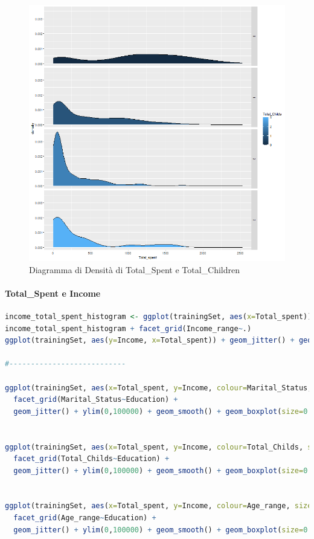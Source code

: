 \documentclass[letterpaper,11pt]{article}
\begin{document}
\begin{figure}[h]
\begin{minipage}[b]{0.4\textwidth}
    \includegraphics[width=\textwidth]{Img/EDA/EDA033.png}
    \caption{Diagramma di Densità di Total\_Spent e Total\_Children}
    \label{fig:DensitaTsTc}
  \end{minipage}
\end{figure}


\newpage
\paragraph{Total\_Spent e Income}

\begin{lstlisting}[language=R]
income_total_spent_histogram <- ggplot(trainingSet, aes(x=Total_spent)) + geom_histogram(aes(fill=Income_range), binwidth = 15, colour = "Black")
income_total_spent_histogram + facet_grid(Income_range~.)
ggplot(trainingSet, aes(y=Income, x=Total_spent)) + geom_jitter() + geom_smooth()

#--------------------------- 

ggplot(trainingSet, aes(x=Total_spent, y=Income, colour=Marital_Status, size=Income)) + 
  facet_grid(Marital_Status~Education) + 
  geom_jitter() + ylim(0,100000) + geom_smooth() + geom_boxplot(size=0.7, alpha=0.5)


ggplot(trainingSet, aes(x=Total_spent, y=Income, colour=Total_Childs, size=Income)) + 
  facet_grid(Total_Childs~Education) + 
  geom_jitter() + ylim(0,100000) + geom_smooth() + geom_boxplot(size=0.7, alpha=0.5)


ggplot(trainingSet, aes(x=Total_spent, y=Income, colour=Age_range, size=Income)) + 
  facet_grid(Age_range~Education) + 
  geom_jitter() + ylim(0,100000) + geom_smooth() + geom_boxplot(size=0.7, alpha=0.5)
\end{lstlisting}
\end{document}
